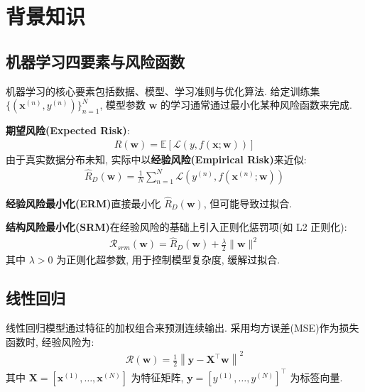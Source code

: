 \documentclass{../../nndlcourse}
\begin{document}
\section{背景知识}

\subsection{机器学习四要素与风险函数}

机器学习的核心要素包括数据、模型、学习准则与优化算法. 给定训练集 $\{(\boldsymbol{x}^{(n)}, y^{(n)})\}_{n=1}^N$, 
模型参数 $\boldsymbol{w}$ 的学习通常通过最小化某种风险函数来完成.

\textbf{期望风险(Expected Risk)}: 
\begin{align}
    R(\boldsymbol{w}) = \mathbb{E}\left[\mathcal{L}\left(y, f(\boldsymbol{x}; \boldsymbol{w})\right)\right]
\end{align}
由于真实数据分布未知, 实际中以\textbf{经验风险(Empirical Risk)}来近似: 
\begin{align}
    \hat{R}_D(\boldsymbol{w}) = \frac{1}{N}\sum_{n=1}^N \mathcal{L}\left(y^{(n)}, f(\boldsymbol{x}^{(n)}; \boldsymbol{w})\right)
\end{align}

\textbf{经验风险最小化(ERM)}直接最小化 $\hat{R}_D(\boldsymbol{w})$, 但可能导致过拟合.

\textbf{结构风险最小化(SRM)}在经验风险的基础上引入正则化惩罚项(如 L2 正则化): 
\begin{align}
    \mathcal{R}_{srm}(\boldsymbol{w}) = \hat{R}_D(\boldsymbol{w}) + \frac{\lambda}{2}\|\boldsymbol{w}\|^2
\end{align}
其中 $\lambda > 0$ 为正则化超参数, 用于控制模型复杂度, 缓解过拟合.

\subsection{线性回归}

线性回归模型通过特征的加权组合来预测连续输出. 采用均方误差(MSE)作为损失函数时, 经验风险为: 
\begin{align}
    \mathcal{R}(\boldsymbol{w}) = \frac{1}{2}\left\|\boldsymbol{y} - \boldsymbol{X}^\top \boldsymbol{w}\right\|^2
\end{align}
其中 $\boldsymbol{X} = [\boldsymbol{x}^{(1)}, \ldots, \boldsymbol{x}^{(N)}]$ 为特征矩阵, $\boldsymbol{y}=[y^{(1)},\ldots,y^{(N)}]^\top$ 为标签向量.
\end{document}
